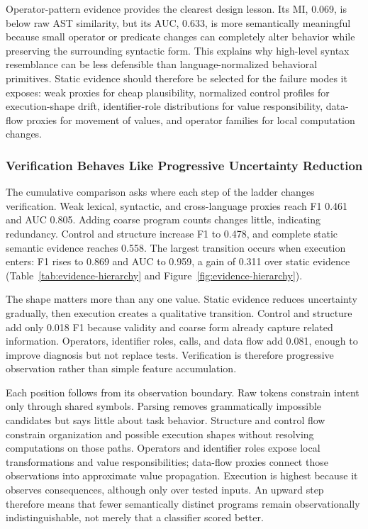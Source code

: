 ﻿\documentclass[conference]{IEEEtran}
\begin{document}
Operator-pattern evidence provides the clearest design lesson. Its MI, 0.069, is below raw AST similarity, but its AUC, 0.633, is more semantically meaningful because small operator or predicate changes can completely alter behavior while preserving the surrounding syntactic form. This explains why high-level syntax resemblance can be less defensible than language-normalized behavioral primitives. Static evidence should therefore be selected for the failure modes it exposes: weak proxies for cheap plausibility, normalized control profiles for execution-shape drift, identifier-role distributions for value responsibility, data-flow proxies for movement of values, and operator families for local computation changes.

\subsubsection{Verification Behaves Like Progressive Uncertainty Reduction}
The cumulative comparison asks where each step of the ladder changes verification. Weak lexical, syntactic, and cross-language proxies reach F1 0.461 and AUC 0.805. Adding coarse program counts changes little, indicating redundancy. Control and structure increase F1 to 0.478, and complete static semantic evidence reaches 0.558. The largest transition occurs when execution enters: F1 rises to 0.869 and AUC to 0.959, a gain of 0.311 over static evidence (Table~\ref{tab:evidence-hierarchy} and Figure~\ref{fig:evidence-hierarchy}).

The shape matters more than any one value. Static evidence reduces uncertainty gradually, then execution creates a qualitative transition. Control and structure add only 0.018 F1 because validity and coarse form already capture related information. Operators, identifier roles, calls, and data flow add 0.081, enough to improve diagnosis but not replace tests. Verification is therefore progressive observation rather than simple feature accumulation.

Each position follows from its observation boundary. Raw tokens constrain intent only through shared symbols. Parsing removes grammatically impossible candidates but says little about task behavior. Structure and control flow constrain organization and possible execution shapes without resolving computations on those paths. Operators and identifier roles expose local transformations and value responsibilities; data-flow proxies connect those observations into approximate value propagation. Execution is highest because it observes consequences, although only over tested inputs. An upward step therefore means that fewer semantically distinct programs remain observationally indistinguishable, not merely that a classifier scored better.
\end{document}
